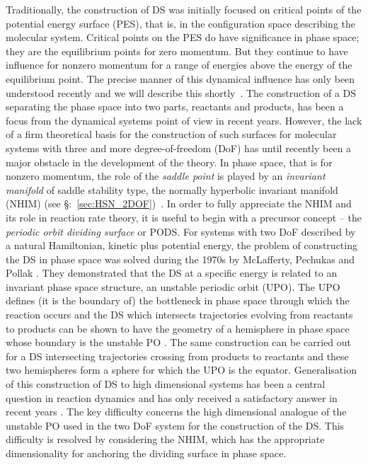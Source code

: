 \documentclass{ws-ijbc}
\begin{document}
Traditionally, the construction of DS was initially focused on critical points of the potential energy surface (PES), that is, in the configuration space describing the molecular system. Critical points on the PES do have significance in phase space; they are the equilibrium points for zero momentum. But they continue to have influence for nonzero momentum for a range of energies above the energy of the equilibrium point. The precise manner of this dynamical influence has only been understood recently and we will describe this shortly~\cite{Komatsuzaki97,Komatsuzaki00,waalkens2004direct}. The construction of a DS separating the phase space into two parts, reactants and products, has been a focus from the dynamical systems point of view in recent years. However, the lack of a firm theoretical basis for the construction of such surfaces for molecular systems with three and more degree-of-freedom (DoF) has until recently been a major obstacle in the development of the theory. In phase space, that is for nonzero momentum, the role of the {\em saddle point} is played by an {\em invariant manifold} of saddle stability type, the normally hyperbolic invariant manifold (NHIM) (see \S:~\ref{sec:HSN_2DOF})~\cite{Wiggins88,wiggins90,wiggins2013normally}. In order to fully appreciate the NHIM and its role in reaction rate theory, it is useful to begin with a precursor concept -- the \emph{periodic orbit dividing surface} or PODS. For systems with two DoF described by a natural Hamiltonian, kinetic plus potential energy, the problem of constructing the DS in phase space was solved during the 1970s by McLafferty, Pechukas and Pollak \cite{Pechukas73,Pechukas77,Pollak78,Pechukas79}. They demonstrated that the DS at a specific energy is related to an invariant phase space structure, an unstable periodic orbit (UPO). The UPO defines (it is the boundary of) the bottleneck in phase space through which the reaction occurs and the DS which intersects trajectories evolving from reactants to products can be shown to have the geometry of a hemisphere in phase space whose boundary is the unstable PO \cite{wiggins2001impenetrable,waalkens2004direct}. The same construction can be carried out for a DS intersecting trajectories crossing from products to reactants and these two hemispheres form a sphere for which the UPO is the equator. Generalisation of this construction of DS to high dimensional systems has been a central question in reaction dynamics and has only received a satisfactory answer in recent years \cite{wiggins2001impenetrable,uzer2002geometry}. The key difficulty concerns the high dimensional analogue of the unstable PO used in the two DoF system for the construction of the DS. This difficulty is resolved by considering the NHIM, which has the appropriate dimensionality for anchoring the dividing surface in phase space.
\end{document}
